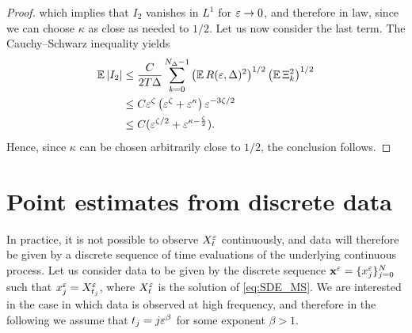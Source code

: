 \documentclass[10pt]{article}
\begin{document}
\begin{proof}
	which implies that $I_2$ vanishes in $L^1$ for $\varepsilon \to 0$, and therefore in law, since we can choose $\kappa$ as close as needed to $1/2$. Let us now consider the last term. The Cauchy--Schwarz inequality yields
	\begin{equation}
	\begin{aligned}
		\operatorname{\mathbb{E}}\left\lvert I_2\right\rvert &\leq \frac{C}{2T\Delta} \sum_{k=0}^{N_\Delta-1} \left(\operatorname{\mathbb{E}} R(\varepsilon, \Delta)^2\right)^{1/2} \left(\operatorname{\mathbb{E}} \Xi_k^2\right)^{1/2} \\
		&\leq C \varepsilon^\zeta \left(\varepsilon^\zeta + \varepsilon^\kappa\right) \varepsilon^{-3\zeta/2}\\
		&\leq C (\varepsilon^{\zeta/2} + \varepsilon^{\kappa - \frac{\zeta}{2}}).
	\end{aligned}
	\end{equation}
	Hence, since $\kappa$ can be chosen arbitrarily close to $1/2$, the conclusion follows.
\end{proof}


\section{Point estimates from discrete data}\label{sec:Disc}

In practice, it is not possible to observe $X_t^\varepsilon$ continuously, and data will therefore be given by a discrete sequence of time evaluations of the underlying continuous process. Let us consider data to be given by the discrete sequence $\mathbf x^\varepsilon = \{x^\varepsilon_j\}_{j=0}^N$ such that $x^\varepsilon_j = X_{t_j}^\varepsilon$, where $X_t^\varepsilon$ is the solution of \eqref{eq:SDE_MS}. We are interested in the case in which data is observed at high frequency, and therefore in the following we assume that $t_j = j\varepsilon^\beta$ for some exponent $\beta > 1$. 
\end{document}

